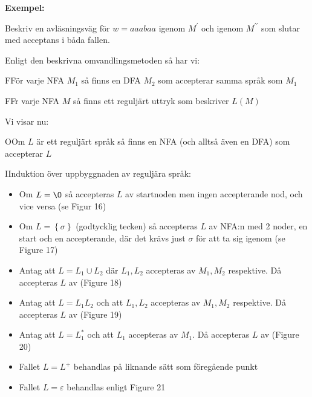 \par\bigskip
\noindent\textbf{Exempel:}\par
\noindent Beskriv en avläsningsväg för $w = aaabaa$ igenom $M^{\prime}$ och igenom $M^{\prime\prime}$ som slutar med acceptans i båda fallen.
\par\bigskip
\noindent Enligt den beskrivna omvandlingsmetoden så har vi:
\par\bigskip
\begin{theo}
  FFör varje NFA $M_1$ så finns en DFA $M_2$ som accepterar samma språk som $M_1$
\end{theo}
\par\bigskip
\begin{theo}
  FFr varje NFA $M$ så finns ett reguljärt uttryk som beskriver $L(M)$
\end{theo}
\noindent Vi visar nu:
\par\bigskip
\begin{theo}
  OOm $L$ är ett reguljärt språk så finns en NFA (och alltså även en DFA) som accepterar $L$
\end{theo}
\newpage
\begin{prf}
  IInduktion över uppbyggnaden av reguljära språk:\par
  \begin{itemize}
    \item Om $L = \O$ så accepteras $L$ av startnoden men ingen accepterande nod, och vice versa (se Figur 16)
    \item Om $L = \left\{\sigma\right\}$ (godtycklig tecken) så accepteras $L$ av NFA:n med 2 noder, en start och en accepterande, där det krävs just $\sigma$ för att ta sig igenom (se Figure 17)
    \item Antag att $L =L_1\cup L_2$ där $L_1,L_2$ accepteras av $M_1,M_2$ respektive. Då accepteras $L$ av (Figure 18)
    \item Antag att $L=L_1L_2$ och att $L_1,L_2$ accepteras av $M_1,M_2$ respektive. Då accepteras $L$ av (Figure 19)
    \item Antag att $L=L_1^*$ och att $L_1$ accepteras av $M_1$. Då accepteras $L$ av (Figure 20)
    \item Fallet $L= L^+$ behandlas på liknande sätt som föregående punkt
    \item Fallet $L=\varepsilon$ behandlas enligt Figure 21
  \end{itemize}\par
\end{prf}
\begin{figure}[ht]
    \centering
    \caption{}
\end{figure}
